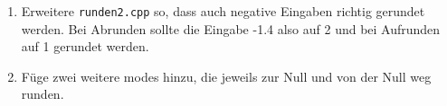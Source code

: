 \begin{praxis}
    \begin{enumerate}
        \item Erweitere \texttt{runden2.cpp} so, dass auch negative Eingaben richtig gerundet werden. Bei Abrunden sollte die Eingabe -1.4 also auf 2 und bei Aufrunden auf 1 gerundet werden.
        \item Füge zwei weitere modes hinzu, die jeweils zur Null und von der Null weg runden.
    \end{enumerate}
\end{praxis}
